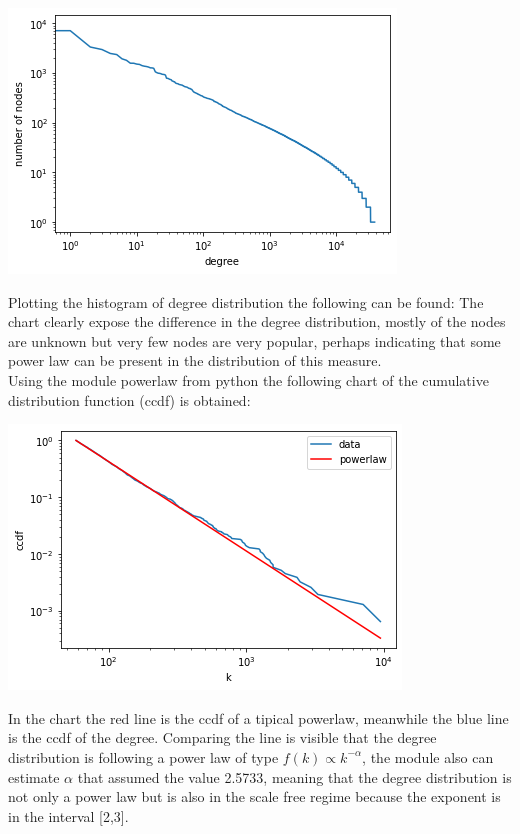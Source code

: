 \documentclass[]{article}
\begin{document}
    \begin{center}
        \includegraphics[scale=0.50]{charts/degree_dist_plot.png}
        \end{center}
    Plotting the histogram of degree distribution the following can be found:
    The chart clearly expose the difference in the degree distribution, mostly of the nodes are unknown but very few nodes are very popular, perhaps indicating that some power law can be present in the distribution of this measure. \\
    Using the module powerlaw from python the following chart of the cumulative distribution function (ccdf) is obtained:
    \begin{center}
    \includegraphics[scale=0.5]{charts/powerlaw.png}
    \end{center}
    In the chart the red line is the ccdf of a tipical powerlaw, meanwhile the blue line is the ccdf of the degree. Comparing the line is visible that the degree distribution is following a power law of type $f(k) \propto k^{-\alpha}$, the module also can estimate $\alpha$ that assumed the value 2.5733, meaning that the degree distribution is not only a power law but is also in the scale free regime because the exponent is in the interval [2,3].
\end{document}
